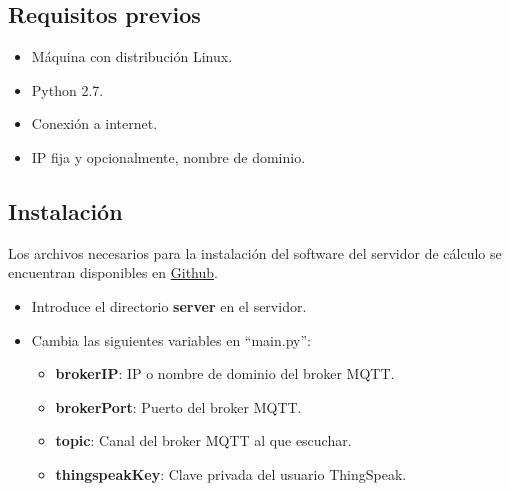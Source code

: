 \subsection{Requisitos previos}
\label{makereference7.3.1}

\begin{itemize}
\item Máquina con distribución Linux.
\item Python 2.7.
\item Conexión a internet.
\item IP fija y opcionalmente, nombre de dominio.
\end{itemize}

\subsection{Instalación}
\label{makereference7.3.2}
Los archivos necesarios para la instalación del software del servidor de cálculo se encuentran disponibles en \href{https://github.com/MrSlide22/TFG/server}{Github}.

\begin{itemize}
	\item Introduce el directorio \textbf{server} en el servidor.
	\item Cambia las siguientes variables en ``main.py'':
	\begin{itemize}
	\item \textbf{brokerIP}: IP o nombre de dominio del broker MQTT.
	\item \textbf{brokerPort}: Puerto del broker MQTT.
	\item \textbf{topic}: Canal del broker MQTT al que escuchar.
	\item \textbf{thingspeakKey}: Clave privada del usuario ThingSpeak.
	\end{itemize}
\end{itemize}